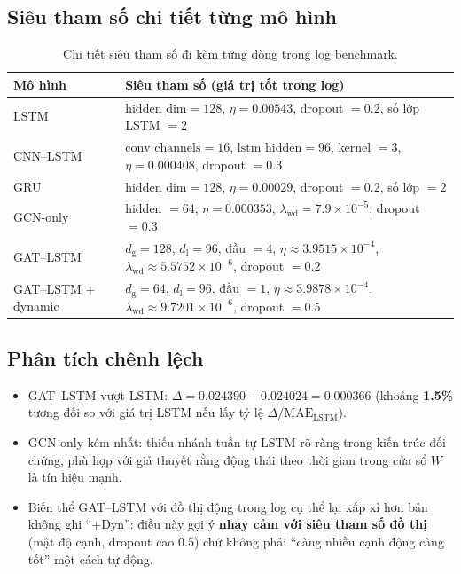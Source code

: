 \documentclass[12pt,a4paper]{article}
\begin{document}
\subsection{Siêu tham số chi tiết từng mô hình}

\begin{table}[H]
\centering\small
\begin{tabular}{@{}l L{7.2cm}@{}}
\toprule
\textbf{Mô hình} & \textbf{Siêu tham số (giá trị tốt trong log)} \\
\midrule
LSTM & $\mathrm{hidden\_dim}=128$, $\eta=0.00543$, dropout $=0.2$, số lớp LSTM $=2$ \\
CNN--LSTM & $\mathrm{conv\_channels}=16$, $\mathrm{lstm\_hidden}=96$, kernel $=3$, $\eta=0.000408$, dropout $=0.3$ \\
GRU & $\mathrm{hidden\_dim}=128$, $\eta=0.00029$, dropout $=0.2$, số lớp $=2$ \\
GCN-only & hidden $=64$, $\eta=0.000353$, $\lambda_{\mathrm{wd}}=7.9\times 10^{-5}$, dropout $=0.3$ \\
GAT--LSTM & $d_{\mathrm{g}}=128$, $d_{\mathrm{l}}=96$, đầu $=4$, $\eta \approx 3.9515\times 10^{-4}$, $\lambda_{\mathrm{wd}} \approx 5.5752\times 10^{-6}$, dropout $=0.2$ \\
GAT--LSTM + dynamic & $d_{\mathrm{g}}=64$, $d_{\mathrm{l}}=96$, đầu $=1$, $\eta \approx 3.9878\times 10^{-4}$, $\lambda_{\mathrm{wd}} \approx 9.7201\times 10^{-6}$, dropout $=0.5$ \\
\bottomrule
\end{tabular}
\caption{Chi tiết siêu tham số đi kèm từng dòng trong log benchmark.}
\label{tab:hyper}
\end{table}

\subsection{Phân tích chênh lệch}
\begin{itemize}[leftmargin=1.5em]
  \item GAT--LSTM vượt LSTM: $\Delta = 0.024390 - 0.024024 = 0.000366$ (khoảng \textbf{1.5\%} tương đối so với giá trị LSTM nếu lấy tỷ lệ $\Delta/\mathrm{MAE}_{\mathrm{LSTM}}$).
  \item GCN-only kém nhất: thiếu nhánh tuần tự LSTM rõ ràng trong kiến trúc đối chứng, phù hợp với giả thuyết rằng động thái theo thời gian trong cửa sổ $W$ là tín hiệu mạnh.
  \item Biến thể GAT--LSTM với đồ thị động trong log cụ thể lại xấp xỉ hơn bản không ghi ``+Dyn'': điều này gợi ý \textbf{nhạy cảm với siêu tham số đồ thị} (mật độ cạnh, dropout cao 0.5) chứ không phải ``càng nhiều cạnh động càng tốt'' một cách tự động.
\end{itemize}
\end{document}

